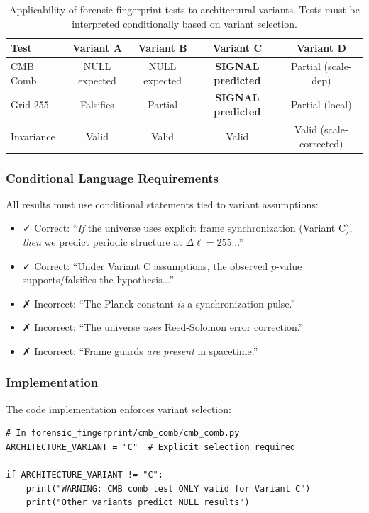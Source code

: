 \begin{table}[h]
\centering
\begin{tabular}{lcccc}
\hline
\textbf{Test} & \textbf{Variant A} & \textbf{Variant B} & \textbf{Variant C} & \textbf{Variant D} \\
\hline
CMB Comb & NULL expected & NULL expected & \textbf{SIGNAL predicted} & Partial (scale-dep) \\
Grid 255 & Falsifies & Partial & \textbf{SIGNAL predicted} & Partial (local) \\
Invariance & Valid & Valid & Valid & Valid (scale-corrected) \\
\hline
\end{tabular}
\caption{Applicability of forensic fingerprint tests to architectural variants. Tests must be interpreted conditionally based on variant selection.}
\end{table}

\subsubsection{Conditional Language Requirements}

All results must use conditional statements tied to variant assumptions:

\begin{itemize}
\item ✓ Correct: ``\emph{If} the universe uses explicit frame synchronization (Variant C), \emph{then} we predict periodic structure at $\Delta\ell = 255$...''
\item ✓ Correct: ``Under Variant C assumptions, the observed $p$-value supports/falsifies the hypothesis...''
\item ✗ Incorrect: ``The Planck constant \emph{is} a synchronization pulse.''
\item ✗ Incorrect: ``The universe \emph{uses} Reed-Solomon error correction.''
\item ✗ Incorrect: ``Frame guards \emph{are present} in spacetime.''
\end{itemize}

\subsubsection{Implementation}

The code implementation enforces variant selection:
\begin{verbatim}
# In forensic_fingerprint/cmb_comb/cmb_comb.py
ARCHITECTURE_VARIANT = "C"  # Explicit selection required

if ARCHITECTURE_VARIANT != "C":
    print("WARNING: CMB comb test ONLY valid for Variant C")
    print("Other variants predict NULL results")
\end{verbatim}

